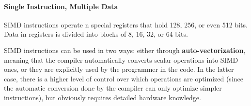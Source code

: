 \paragraph{Single Instruction, Multiple Data}
SIMD instructions operate n special registers that hold 128, 256, or even 512 bits. Data in registers is divided into blocks of 8, 16, 32, or 64 bits.

SIMD instructions can be used in two ways: either through \textbf{auto-vectorization}, meaning that the compiler automatically converts scalar operations into SIMD ones, or they are explicitly used by the programmer in the code. In the latter case, there is a higher level of control over which operations are optimized (since the automatic conversion done by the compiler can only optimize simpler instructions), but obviously requires detailed hardware knowledge.